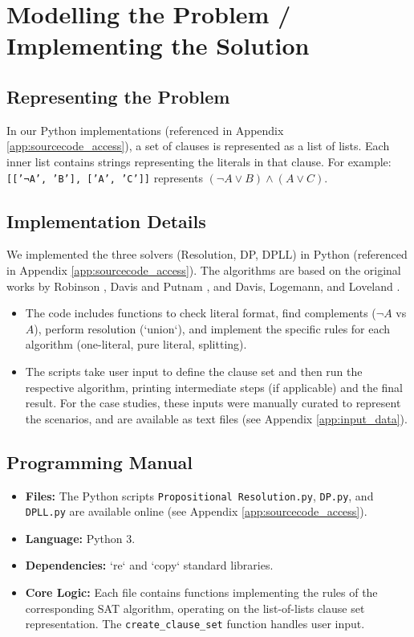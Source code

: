 \documentclass[11pt, a4paper]{article}
\begin{document}
\section{Modelling the Problem / Implementing the Solution} \label{sec:implementation}
\subsection*{Representing the Problem}
In our Python implementations (referenced in Appendix \ref{app:sourcecode_access}), a set of clauses is represented as a list of lists. Each inner list contains strings representing the literals in that clause. For example: \texttt{[['¬A', 'B'], ['A', 'C']]} represents $(\neg A \vee B) \wedge (A \vee C)$.
\subsection*{Implementation Details}
We implemented the three solvers (Resolution, DP, DPLL) in Python (referenced in Appendix \ref{app:sourcecode_access}). The algorithms are based on the original works by Robinson \cite{Robinson1965}, Davis and Putnam \cite{DavisPutnam1960}, and Davis, Logemann, and Loveland \cite{DPLL1962}.
\begin{itemize}
    \item The code includes functions to check literal format, find complements ($\neg A$ vs $A$), perform resolution (`union`), and implement the specific rules for each algorithm (one-literal, pure literal, splitting).
    \item The scripts take user input to define the clause set and then run the respective algorithm, printing intermediate steps (if applicable) and the final result. For the case studies, these inputs were manually curated to represent the scenarios, and are available as text files (see Appendix \ref{app:input_data}).
\end{itemize}
\subsection*{Programming Manual}
\begin{itemize}
    \item \textbf{Files:} The Python scripts \texttt{Propositional Resolution.py}, \texttt{DP.py}, and \texttt{DPLL.py} are available online (see Appendix \ref{app:sourcecode_access}).
    \item \textbf{Language:} Python 3.
    \item \textbf{Dependencies:} `re` and `copy` standard libraries.
    \item \textbf{Core Logic:} Each file contains functions implementing the rules of the corresponding SAT algorithm, operating on the list-of-lists clause set representation. The \texttt{create\_clause\_set} function handles user input.
\end{itemize}
\end{document}
